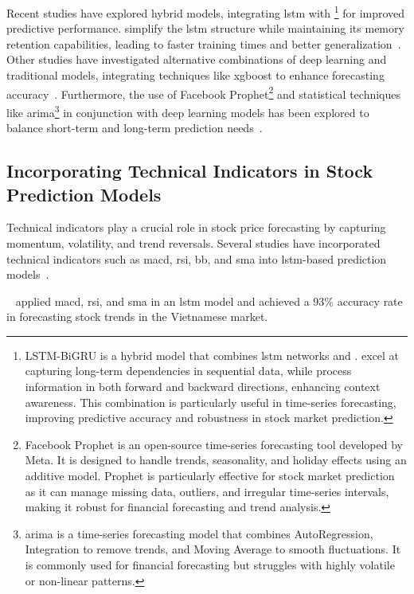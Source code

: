 Recent studies have explored hybrid models, integrating \acrshort{lstm} with 
\footnote{LSTM-BiGRU is a hybrid model that combines \acrshort{lstm} 
networks and .  excel at capturing long-term dependencies in sequential
data, while  process information in both forward and backward directions, enhancing
context awareness. This combination is particularly useful in time-series forecasting, improving
predictive accuracy and robustness in stock market prediction.} for improved predictive performance.
 simplify the \acrshort{lstm} structure while maintaining its memory retention
capabilities, leading to faster training times and better generalization~\parencite{guo2024LSTMStock}.
Other studies have investigated alternative combinations of deep learning and traditional models,
integrating techniques like \acrfull{xgboost} to enhance forecasting
accuracy~\parencite{agrawal2022StockPrediction}. Furthermore, the use of 
Facebook Prophet\footnote{Facebook Prophet is an open-source time-series forecasting tool developed by
Meta. It is designed to handle trends, seasonality, and holiday effects using an additive model. 
Prophet is particularly effective for stock market prediction as it can manage missing data, outliers,
and irregular time-series intervals, making it robust for financial forecasting and trend analysis.} and 
statistical techniques like \acrfull{arima}\footnote{\acrshort{arima} is a time-series forecasting model
that combines AutoRegression, Integration to remove trends, and Moving Average to smooth fluctuations.
It is commonly used for financial forecasting but struggles with highly volatile or non-linear
patterns.} in conjunction with deep learning models has been explored to balance short-term and 
long-term prediction needs~\parencite{phuoc2024StockPrediction}.

\subsection{Incorporating Technical Indicators in Stock Prediction Models}

Technical indicators play a crucial role in stock price forecasting by capturing momentum, volatility, 
and trend reversals. Several studies have incorporated technical indicators such as 
\acrshort{macd}, \acrshort{rsi}, \acrshort{bb}, and \acrshort{sma} into \acrshort{lstm}-based 
prediction models~\parencite{guo2024LSTMStock}.

~\parencite{phuoc2024StockPrediction} applied \acrshort{macd}, 
\acrshort{rsi}, and \acrshort{sma} in an \acrshort{lstm} model and achieved a 93\% accuracy rate in
forecasting stock trends in the Vietnamese market.   

